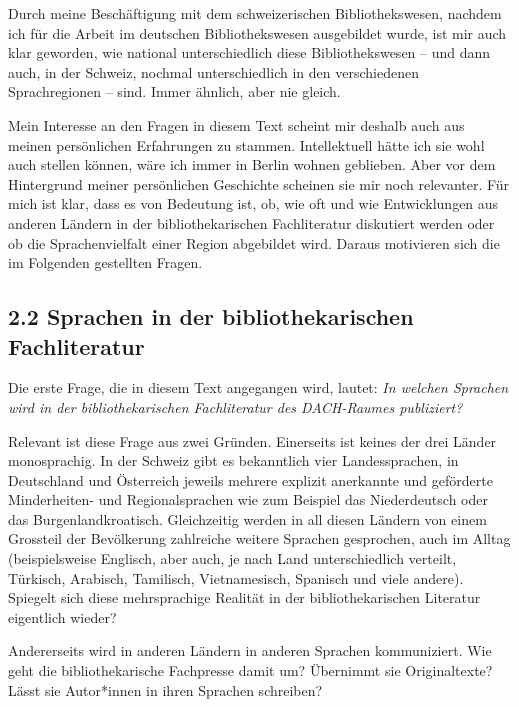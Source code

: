 \documentclass[a4paper,
fontsize=11pt,
oneside,
numbers=noperiodatend,
parskip=half-,
bibliography=totoc,
final
]{scrartcl}
\begin{document}
Durch meine Beschäftigung mit dem schweizerischen Bibliothekswesen,
nachdem ich für die Arbeit im deutschen Bibliothekswesen ausgebildet
wurde, ist mir auch klar geworden, wie national unterschiedlich diese
Bibliothekswesen -- und dann auch, in der Schweiz, nochmal
unterschiedlich in den verschiedenen Sprachregionen -- sind. Immer
ähnlich, aber nie gleich.

Mein Interesse an den Fragen in diesem Text scheint mir deshalb auch aus
meinen persönlichen Erfahrungen zu stammen. Intellektuell hätte ich sie
wohl auch stellen können, wäre ich immer in Berlin wohnen geblieben.
Aber vor dem Hintergrund meiner persönlichen Geschichte scheinen sie mir
noch relevanter. Für mich ist klar, dass es von Bedeutung ist, ob, wie
oft und wie Entwicklungen aus anderen Ländern in der bibliothekarischen
Fachliteratur diskutiert werden oder ob die Sprachenvielfalt einer
Region abgebildet wird. Daraus motivieren sich die im Folgenden
gestellten Fragen.

\hypertarget{sprachen-in-der-bibliothekarischen-fachliteratur}{%
\subsection{2.2 Sprachen in der bibliothekarischen
Fachliteratur}\label{sprachen-in-der-bibliothekarischen-fachliteratur}}

Die erste Frage, die in diesem Text angegangen wird, lautet: \emph{In
welchen Sprachen wird in der bibliothekarischen Fachliteratur des
DACH-Raumes publiziert?}

Relevant ist diese Frage aus zwei Gründen. Einerseits ist keines der
drei Länder monosprachig. In der Schweiz gibt es bekanntlich vier
Landessprachen, in Deutschland und Österreich jeweils mehrere explizit
anerkannte und geförderte Minderheiten- und Regionalsprachen wie zum
Beispiel das Niederdeutsch oder das Burgenlandkroatisch. Gleichzeitig
werden in all diesen Ländern von einem Grossteil der Bevölkerung
zahlreiche weitere Sprachen gesprochen, auch im Alltag (beispielsweise
Englisch, aber auch, je nach Land unterschiedlich verteilt, Türkisch,
Arabisch, Tamilisch, Vietnamesisch, Spanisch und viele andere). Spiegelt
sich diese mehrsprachige Realität in der bibliothekarischen Literatur
eigentlich wieder?

Andererseits wird in anderen Ländern in anderen Sprachen kommuniziert.
Wie geht die bibliothekarische Fachpresse damit um? Übernimmt sie
Originaltexte? Lässt sie Autor*innen in ihren Sprachen schreiben?
\end{document}
